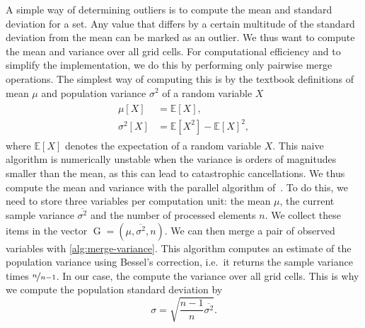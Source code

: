 \newcommand{\gobs}{\operatorname{G}}
\newcommand{\mean}{\mu}
\newcommand{\std}{\sigma}
\newcommand{\variance}{\std^2}
\newcommand{\gobsCount}{n}
\newcommand{\sampleVariance}{\overline{\variance}}
A simple way of determining outliers is to compute the mean and standard deviation for a set.
Any value that differs by a certain multitude of the standard deviation from the mean can be marked as an outlier.
We thus want to compute the mean and variance over all grid cells.
For computational efficiency and to simplify the implementation, we do this by performing only pairwise merge operations.
The simplest way of computing this is by the textbook definitions of mean $\mean$ and population variance $\variance$ of a random variable $X$
\newcommand{\expectation}{\mathbb{E}}
\begin{align}
  \begin{split}
    \mean [X] &= \expectation \left[ X \right],\\
    \variance [X] &= \expectation \left[ X^2 \right] - \expectation \left[ X \right]^2,
  \end{split}
\end{align}
where $\expectation \left[ X \right]$ denotes the expectation of a random variable $X$.
This naive algorithm is numerically unstable when the variance is orders of magnitudes smaller than the mean, as this can lead to catastrophic cancellations.
We thus compute the mean and variance with the parallel algorithm of~\cite{chan1982updating}.
To do this, we need to store three variables per computation unit:
the mean $\mean$, the current sample variance $\sampleVariance$ and the number of processed elements $n$.
We collect these items in the vector $\gobs = (\mean, \sampleVariance, \gobsCount)$.
We can then merge a pair of observed variables with \cref{alg:merge-variance}.
This algorithm computes an estimate of the population variance using Bessel's correction, i.e.\ it returns the sample variance times $\nicefrac{n}{n-1}$.
In our case, the compute the variance over all grid cells.
This is why we compute the population standard deviation by
\begin{equation}
  \label{eq:sample-std}
 \sigma = \sqrt{ \frac{n-1}{n} \sampleVariance}.
\end{equation}

